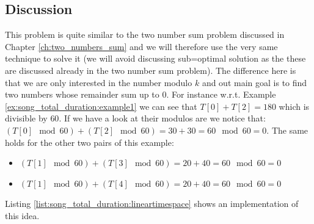 \subsection{Discussion}
This problem is quite similar to the two number sum problem discussed in Chapter \ref{ch:two_numbers_sum} and we will therefore use the very same technique to solve it (we will avoid discussing sub=optimal solution as the these are discussed already in the two number sum problem).
The difference here is that we are only interested in the number modulo $k$ and out main goal is to find two numbers whose remainder sum up to $0$.
For instance w.r.t. Example \ref{ex:song_total_duration:example1} we can see that  $T[0]+T[2] = 180$ which is divisible by $60$. 
If we have a look at their modulos are we notice that: $(T[0] \mod{60}) +(T[2] \mod{60}) = 30+30 = 60 \mod{60} =0$.
The same holds for the other two pairs of this example:
\begin{itemize}
    \item $(T[1] \mod{60}) +(T[3] \mod{60}) = 20+40 = 60 \mod{60} =0$
    \item $(T[1] \mod{60}) +(T[4] \mod{60}) = 20+40 = 60 \mod{60} =0$
\end{itemize}


Listing \ref{list:song_total_duration:lineartimespace} shows an implementation of this idea.





